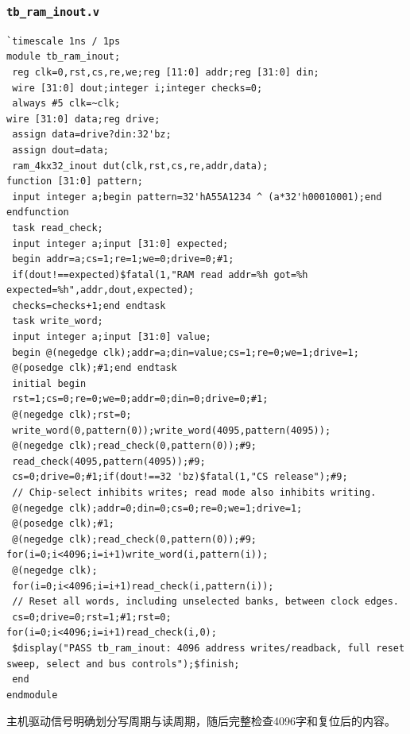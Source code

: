 \documentclass[12pt,a4paper]{ctexart}
\begin{document}
\subsubsection*{\texttt{tb\_ram\_inout.v}}
\begin{lstlisting}
`timescale 1ns / 1ps
module tb_ram_inout;
 reg clk=0,rst,cs,re,we;reg [11:0] addr;reg [31:0] din;
 wire [31:0] dout;integer i;integer checks=0;
 always #5 clk=~clk;
wire [31:0] data;reg drive;
 assign data=drive?din:32'bz;
 assign dout=data;
 ram_4kx32_inout dut(clk,rst,cs,re,addr,data);
function [31:0] pattern;
 input integer a;begin pattern=32'hA55A1234 ^ (a*32'h00010001);end endfunction
 task read_check;
 input integer a;input [31:0] expected;
 begin addr=a;cs=1;re=1;we=0;drive=0;#1;
 if(dout!==expected)$fatal(1,"RAM read addr=%h got=%h expected=%h",addr,dout,expected);
 checks=checks+1;end endtask
 task write_word;
 input integer a;input [31:0] value;
 begin @(negedge clk);addr=a;din=value;cs=1;re=0;we=1;drive=1;
 @(posedge clk);#1;end endtask
 initial begin
 rst=1;cs=0;re=0;we=0;addr=0;din=0;drive=0;#1;
 @(negedge clk);rst=0;
 write_word(0,pattern(0));write_word(4095,pattern(4095));
 @(negedge clk);read_check(0,pattern(0));#9;
 read_check(4095,pattern(4095));#9;
 cs=0;drive=0;#1;if(dout!==32 'bz)$fatal(1,"CS release");#9;
 // Chip-select inhibits writes; read mode also inhibits writing.
 @(negedge clk);addr=0;din=0;cs=0;re=0;we=1;drive=1;
 @(posedge clk);#1;
 @(negedge clk);read_check(0,pattern(0));#9;
for(i=0;i<4096;i=i+1)write_word(i,pattern(i));
 @(negedge clk);
 for(i=0;i<4096;i=i+1)read_check(i,pattern(i));
 // Reset all words, including unselected banks, between clock edges.
 cs=0;drive=0;rst=1;#1;rst=0;
for(i=0;i<4096;i=i+1)read_check(i,0);
 $display("PASS tb_ram_inout: 4096 address writes/readback, full reset sweep, select and bus controls");$finish;
 end
endmodule
\end{lstlisting}
主机驱动信号明确划分写周期与读周期，随后完整检查4096字和复位后的内容。
\end{document}
